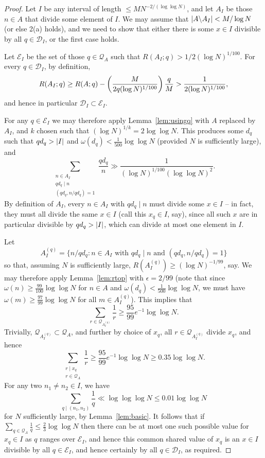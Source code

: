 \begin{proof}
Let $I$ be any interval of length $\leq MN^{-2/(\log\log N)}$, and let $A_I$ be those $n\in A$ that divide some element of $I$. We may assume that $\left\lvert A\backslash A_I\right\rvert< M/\log N$ (or else 2(a) holds), and we need to show that either there is some $x\in I$ divisible by all $q\in\mathcal{D}_I$, or the first case holds.

Let $\mathcal{E}_I$ be the set of those $q\in\mathcal{Q}_A$ such that $R(A_I;q)> 1/2(\log N)^{1/100}$. For every $q\in \mathcal{D}_I$, by definition,
\[R(A_I; q) \geq R(A;q) - \left( \frac{M}{2q(\log N)^{1/100}}\right)\frac{q}{M}>\frac{1}{2(\log N)^{1/100}},\]
and hence in particular $\mathcal{D}_I\subset \mathcal{E}_I$.

For any $q\in \mathcal{E}_I$ we may therefore apply Lemma~\ref{lem:usingq} with $A$ replaced by $A_I$, and $k$ chosen such that $(\log N)^{1/k}=2\log\log N$. This produces some $d_q$ such that $qd_q>\left\lvert I\right\rvert$ and $\omega(d_q)<\tfrac{1}{500}\log\log N$ (provided $N$ is sufficiently large), and
\[\sum_{\substack{n\in A_I\\ qd_q\mid n\\ (qd_q,n/qd_q)=1}}\frac{qd_q}{n}\gg \frac{1}{(\log N)^{1/100}(\log\log N)^2}.\]
By definition of $A_I$, every $n\in A_I$ with $qd_q\mid n$ must divide some $x\in I$ -- in fact, they must all divide the same $x\in I$ (call this $x_q\in I$, say), since all such $x$ are in particular divisible by $qd_q>\left\lvert I\right\rvert$, which can divide at most one element in $I$.

Let
\[A_I^{(q)}=\{ n/qd_q : n\in A_I\textrm{ with }qd_q\mid n\textrm{ and }(qd_q,n/qd_q)=1\}\]
so that, assuming $N$ is sufficiently large, $R(A_I^{(q)})\geq (\log N)^{-1/99}$, say. We may therefore apply Lemma~\ref{lem:rtop} with $\epsilon=2/99$ (note that since $\omega(n)\geq \frac{99}{100}\log\log N$ for $n\in A$ and $\omega(d_q)<\frac{1}{500}\log\log N$, we must have $\omega(m)\geq \frac{97}{99}\log\log N$ for all $m\in A_I^{(q)}$). This implies that
\[\sum_{r\in \mathcal{Q}_{A_I^{(q)}}}\frac{1}{r}\geq \frac{95}{99}e^{-1}\log\log N.\]
Trivially, $\mathcal{Q}_{A_I^{(q)}}\subset \mathcal{Q}_A$, and further by choice of $x_q$, all $r\in \mathcal{Q}_{A_I^{(q)}}$ divide $x_q$, and hence
\[\sum_{\substack{r\mid x_q\\ r\in \mathcal{Q}_A}}\frac{1}{r}\geq \frac{95}{99}e^{-1}\log\log N\geq 0.35\log\log N.\]
For any two $n_1\neq n_2\in I$, we have
\[\sum_{q\mid (n_1,n_2)}\frac{1}{q}\ll \log\log\log N\leq 0.01\log\log N\]
for $N$ sufficiently large, by Lemma~\ref{lem:basic}. It follows that if $\sum_{q\in\mathcal{Q}_A}\frac{1}{q}\leq \frac{2}{3}\log\log N$ then there can be at most one such possible value for $x_q\in I$ as $q$ ranges over $\mathcal{E}_I$, and hence this common shared value of $x_q$ is an $x\in I$ divisible by all $q\in\mathcal{E}_I$, and hence certainly by all $q\in\mathcal{D}_I$, as required.


\end{proof}
